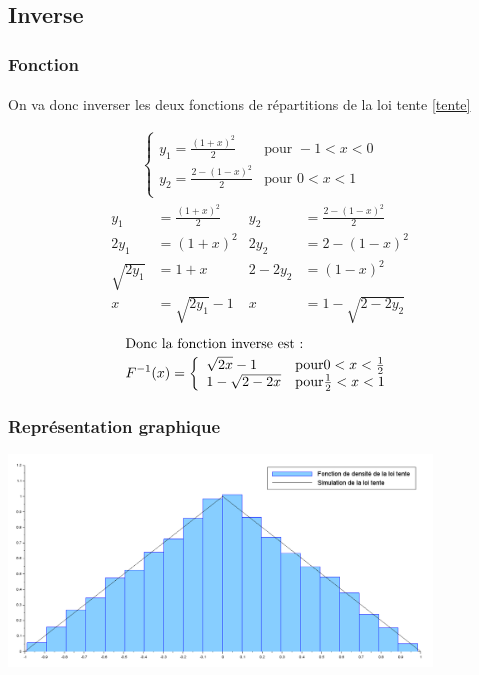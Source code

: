 \documentclass{article}
\begin{document}
\paragraph{}

\subsection{Inverse}

\subsubsection{Fonction}
\paragraph{} On va donc inverser les deux fonctions de répartitions de la loi tente \eqref{tente}

\begin{align}
\left\{
	\begin{array}{ll}
		y_1=\frac{(1+x)^2}{2} &\mbox{pour } -1<x<0\\
		y_2=\frac{2-(1-x)^2}{2} &\mbox{pour } 0<x<1\\
	\end{array}
\right.
\end{align}
\begin{align}
y_1 & =\frac{(1+x)^2}{2} & y_2 & = \frac{2-(1-x)^2}{2} \\
2y_1 & = (1+x)^2 & 2y_2 & = 2 - (1-x)^2 \\
\sqrt{2y_1} & = 1+x & 2-2y_2 & = (1-x)^2 \\
x & = \sqrt{2y_1} - 1 & x & = 1- \sqrt{ 2-2y_2}
\end{align}
\begin{align}
\intertext{Donc la fonction inverse est :}
F^{-1}(x)=\left\{
		\begin{array}{ll}
			\sqrt{2x}-1 & \mbox{pour} 0<x<\frac{1}{2} \\
			1-\sqrt{2-2x} & \mbox{pour} \frac{1}{2}<x<1
		\end{array}
\right.
\end{align}


\subsubsection{Représentation graphique}
\begin{center}
\includegraphics[width=425px]{img/tente_inversion.png}
\end{center}
\end{document}
